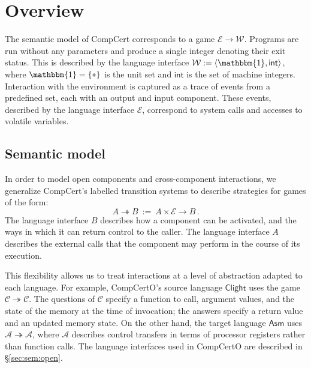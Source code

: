\documentclass[11pt,oneside,draft]{book}
\theoremstyle{definition}
\newcommand{\kw}[1]{\ensuremath{ \mathsf{#1} }}
\begin{document}
\section{Overview} \label{sec:mainideas:compcerto} %

The semantic model of CompCert corresponds to
a game $\mathcal{E} \rightarrow \mathcal{W}$.
Programs are run without any parameters
and produce a single integer denoting their exit status.
This is described by the language interface
$\mathcal{W} := \langle \mathbbm{1}, \kw{int} \rangle$,
where $\mathbbm{1} = \{ * \}$ is the unit set
and $\kw{int}$ is the set of machine integers.
Interaction with the environment
is captured as a trace of events from a predefined set,
each with an output and input component.
These events,
described by the language interface $\mathcal{E}$,
correspond to system calls and accesses to volatile variables.

\subsection{Semantic model} %

In order to model open components and cross-component interactions,
we generalize CompCert's labelled transition systems
to describe strategies for games of the form:
\[ A \twoheadrightarrow B \: := \:
   A \times \mathcal{E} \rightarrow B \,. \]
The language interface $B$ describes how a component can be activated,
and the ways in which it can return control to the caller.
The language interface $A$ describes the external calls that the component
may perform in the course of its execution.

This flexibility allows us to treat interactions
at a level of abstraction adapted to each language.
For example, CompCertO's source language \kw{Clight} uses the game
\mbox{$\mathcal{C} \twoheadrightarrow \mathcal{C}$}.
The questions of $\mathcal{C}$ specify a function to call,
argument values,
and the state of the memory at the time of invocation;
the answers specify a return value and an updated memory state.
On the other hand, the target language \kw{Asm} uses
$\mathcal{A} \twoheadrightarrow \mathcal{A}$,
where $\mathcal{A}$ describes control transfers
in terms of processor registers
rather than function calls.
The language interfaces used in CompCertO
are described in \S\ref{sec:sem:open}.
\end{document}
